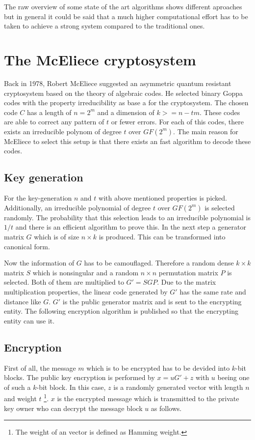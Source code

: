 The raw overview of some state of the art algorithms shows different aproaches but in general it could be said that a much higher computational effort has to be taken to achieve a strong system compared to the traditional ones. 

\section{The McEliece cryptosystem}
\label{mceliece}
Back in 1978, Robert McEliece suggested an asymmetric quantum resistant cryptosystem based on the theory of algebraic codes. He selected binary Goppa codes with the property irreducibility as base a for the cryptosystem\cite{mceliece1978public}. The chosen code $C$ has a length of $n = 2^m$ and a dimension of $k >= n - tm$. These codes are able to correct any pattern of $t$ or fewer errors. 
For each of this codes, there exists an irreducible polynom of degree $t$ over $GF(2^m)$. 
The main reason for McEliece to select this setup is that there exists an fast algorithm to decode these codes\cite{mceliece2002theory}.

\subsection*{Key generation}
For the key-generation $n$ and $t$ with above mentioned properties is picked. Additionally, an irreducible polynomial of degree $t$ over $GF(2^m)$  is selected randomly. The probability that this selection leads to an irreducible polynomial is $1/t$ and there is an efficient algorithm to prove this\cite{berlekamp1968algebraic}.
In the next step a generator matrix $G$ which is of size $n \times k$ is produced. This can be transformed into canonical form. 

Now the information of $G$ has to be camouflaged. Therefore a random dense $k \times k$ matrix $S$ which is nonsingular and a random $n \times n$ permutation matrix $P$ is selected. Both of them are multiplied to $G' = SGP$. Due to the matrix multiplication properties, the linear code generated by $G'$ has the same rate and distance like $G$. $G'$ is the public generator matrix and is sent to the encrypting entity. 
\newline
\newline
The following encryption algorithm is published so that the encrypting entity can use it. 

\subsection*{Encryption}
First of all, the message $m$ which is to be encrypted has to be devided into $k$-bit blocks. The public key encryption is performed by $x = uG' + z$ with $u$ beeing one of such a $k$-bit block. In this case, $z$ is a randomly generated vector with length $n$ and weight $t$ \footnote{The weight of an vector is defined as Hamming weight.}.
\newline
\newline
$x$ is the encrypted message which is transmitted to the private key owner who can decrypt the message block $u$ as follows. 

